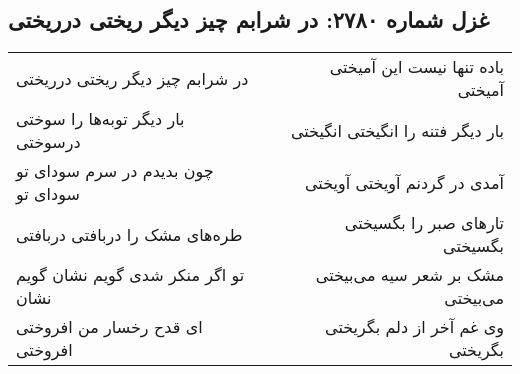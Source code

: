 \begin{center}
\section*{غزل شماره ۲۷۸۰: در شرابم چیز دیگر ریختی درریختی}
\label{sec:2780}
\begin{longtable}{l p{0.5cm} r}
در شرابم چیز دیگر ریختی درریختی
&&
باده تنها نیست این آمیختی آمیختی
\\
بار دیگر توبه‌ها را سوختی درسوختی
&&
بار دیگر فتنه را انگیختی انگیختی
\\
چون بدیدم در سرم سودای تو سودای تو
&&
آمدی در گردنم آویختی آویختی
\\
طره‌های مشک را دربافتی دربافتی
&&
تارهای صبر را بگسیختی بگسیختی
\\
تو اگر منکر شدی گویم نشان گویم نشان
&&
مشک بر شعر سیه می‌بیختی می‌بیختی
\\
ای قدح رخسار من افروختی افروختی
&&
وی غم آخر از دلم بگریختی بگریختی
\\
\end{longtable}
\end{center}
